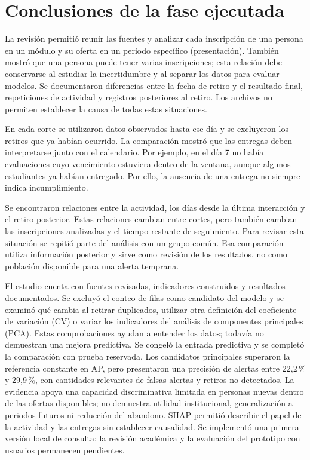 \section{Conclusiones de la fase ejecutada}
La revisión permitió reunir las fuentes y analizar cada inscripción de una persona en un módulo y su oferta en un periodo específico (presentación). También mostró que una persona puede tener varias inscripciones; esta relación debe conservarse al estudiar la incertidumbre y al separar los datos para evaluar modelos. Se documentaron diferencias entre la fecha de retiro y el resultado final, repeticiones de actividad y registros posteriores al retiro. Los archivos no permiten establecer la causa de todas estas situaciones.

En cada corte se utilizaron datos observados hasta ese día y se excluyeron los retiros que ya habían ocurrido. La comparación mostró que las entregas deben interpretarse junto con el calendario. Por ejemplo, en el día 7 no había evaluaciones cuyo vencimiento estuviera dentro de la ventana, aunque algunos estudiantes ya habían entregado. Por ello, la ausencia de una entrega no siempre indica incumplimiento.

Se encontraron relaciones entre la actividad, los días desde la última interacción y el retiro posterior. Estas relaciones cambian entre cortes, pero también cambian las inscripciones analizadas y el tiempo restante de seguimiento. Para revisar esta situación se repitió parte del análisis con un grupo común. Esa comparación utiliza información posterior y sirve como revisión de los resultados, no como población disponible para una alerta temprana.

El estudio cuenta con fuentes revisadas, indicadores construidos y resultados documentados. Se excluyó el conteo de filas como candidato del modelo y se examinó qué cambia al retirar duplicados, utilizar otra definición del coeficiente de variación (CV) o variar los indicadores del análisis de componentes principales (PCA). Estas comprobaciones ayudan a entender los datos; todavía no demuestran una mejora predictiva. Se congeló la entrada predictiva y se completó la comparación con prueba reservada. Los candidatos principales superaron la referencia constante en AP, pero presentaron una precisión de alertas entre 22,2\,\% y 29,9\,\%, con cantidades relevantes de falsas alertas y retiros no detectados. La evidencia apoya una capacidad discriminativa limitada en personas nuevas dentro de las ofertas disponibles; no demuestra utilidad institucional, generalización a periodos futuros ni reducción del abandono. SHAP permitió describir el papel de la actividad y las entregas sin establecer causalidad. Se implementó una primera versión local de consulta; la revisión académica y la evaluación del prototipo con usuarios permanecen pendientes.

